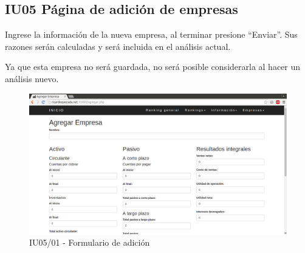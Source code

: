 \hypertarget{IU05}{\subsection{IU05 Página de adición de empresas}}

    Ingrese la información de la nueva empresa, al terminar presione ``Enviar''.
    Sus razones serán calculadas y será incluida en el análisis actual.

    Ya que esta empresa no será guardada,
    no será posible considerarla al hacer un análisis nuevo.

    \begin{figure}[H]
        \begin{center}
            \includegraphics[scale=0.3]{pantallas/Agregar1}
            \caption{IU05/01 - Formulario de adición}
        \end{center}
    \end{figure}
